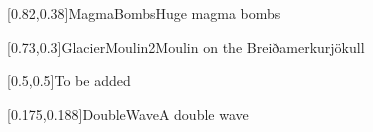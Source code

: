 



\graphicspath{{Figures/}{Figures/Iceland/}}


\subtitle{Day 4}
\date{29.10.2020}


    
    [0.82,0.38]{MagmaBombs}{Huge magma bombs}
    
    [0.73,0.3]{GlacierMoulin2}{Moulin on the Breiðamerkurj\"okull}
    
    [0.5,0.5]{}{To be added}
    
    [0.175,0.188]{DoubleWave}{A double wave}
    
    

